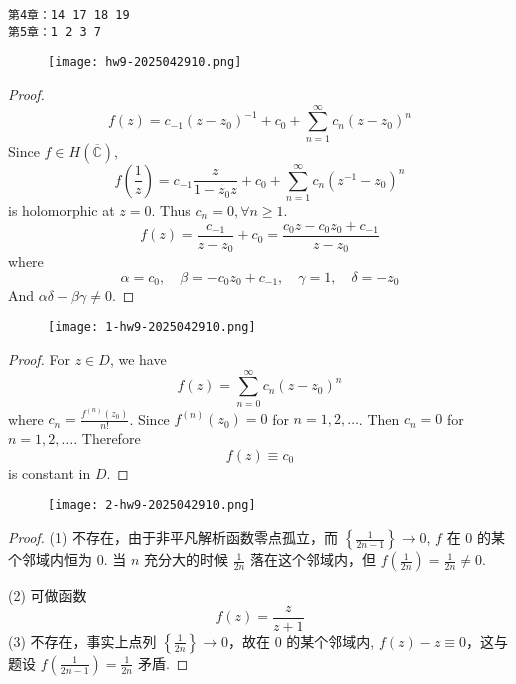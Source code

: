 \begin{lstlisting}
第4章：14 17 18 19 
第5章：1 2 3 7
\end{lstlisting}
\begin{exercise}
\begin{figure}[H]
\centering
\texttt{[image: hw9-2025042910.png]}
\label{}
\end{figure}
\end{exercise}
\begin{proof}
\[
f(z)=c_{-1}(z-z_0)^{-1}+c_0+\sum_{n=1}^{\infty} c_n(z-z_0)^{n}
\]
Since $f\in H(\overline{\mathbb{C}})$,
\[
f\left( \frac{1}{z} \right)=c_{-1} \frac{z}{1-z_0z}+c_0+\sum_{n=1}^{\infty} c_n(z^{-1}-z_0)^{n}
\]
is holomorphic at $z=0$. Thus $c_n=0,\forall n\geq1$.
\[
f(z)=\frac{c_{-1}}{z-z_0}+c_0=\frac{c_0z-c_0z_0+c_{-1}}{z-z_0}
\]
where
\[
\alpha=c_0 ,\quad \beta=-c_0z_0+c_{-1},\quad \gamma=1,\quad \delta=-z_0
\]
And $\alpha\delta-\beta\gamma\neq0$.
\end{proof}

\begin{exercise}
\begin{figure}[H]
\centering
\texttt{[image: 1-hw9-2025042910.png]}
\label{}
\end{figure}
\end{exercise}
\begin{proof}
For $z\in D$, we have
\[
f(z)=\sum_{n=0}^{\infty} c_n(z-z_0)^{n}
\]
where $c_n=\frac{f^{(n)}(z_0)}{n!}$. Since $f^{(n)}(z_0)=0$ for $n=1,2,\dots$. Then $c_n=0$ for $n=1,2,\dots$. Therefore
\[
f(z)\equiv c_0
\]
is constant in $D$.

\end{proof}

\begin{exercise}
\begin{figure}[H]
\centering
\texttt{[image: 2-hw9-2025042910.png]}
\label{}
\end{figure}
\end{exercise}
\begin{proof}
(1)
不存在，由于非平凡解析函数零点孤立，而 $\left\{  \frac{1}{2n-1}  \right\}\to0$, $f$ 在 0 的某个邻域内恒为 0. 当 $n$ 充分大的时候 $\frac{1}{2n}$ 落在这个邻域内，但 $f\left( \frac{1}{2n} \right)=\frac{1}{2n}\neq0$.

(2)
可做函数
\[
f(z)=\frac{z}{z+1}
\]
(3)
不存在，事实上点列 $\left\{  \frac{1}{2n}  \right\}\to0$，故在 0 的某个邻域内, $f(z)-z\equiv0$，这与题设 $f\left( \frac{1}{2n-1} \right)=\frac{1}{2n}$ 矛盾.

\end{proof}

